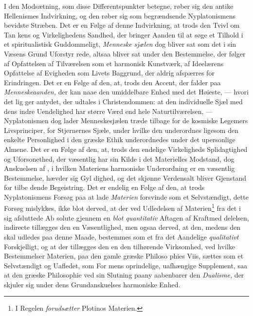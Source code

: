 I den Modsætning, som disse Differentspunkter betegne,
røber sig den antike Hellenismes Indvirkning, og den røber
sig som begrændsende Nyplatonismens bevidste Stræben. Det
er en Følge af denne Indvirkning, at trods den Tvivl om Tan\-%
kens og Virkelighedens Sandhed, der bringer Aanden til at
søge et Tilhold i et spiritualistisk Guddommeligt, \emph{Menneske\-%
sjælen} dog bliver sat som det i sin Væsens Grund Uforstyr\-%
rede, altsaa bliver sat under den Bestemmelse, der følger af
Opfattelsen af Tilværelsen som et harmonisk Kunstværk, af
Ideelærens Opfattelse af Evigheden som Livets Baggrund, der
aldrig afspærres for Erindringen. Det er en Følge af den, at,
trods den Accent, der falder paa \emph{Menneskeaanden,} der kan
naae den umiddelbare Enhed med det Høieste, --- hvori det lig\-%
ger antydet, der udtales i Christendommen: at den individuelle
Sjæl med dens indre Uendelighed har større Værd end hele
Naturtilværelsen, --- Nyplatonismen dog lader Menneskesjælen
træde tilbage for de kosmiske Legemers Livsprinciper, for
 \setcounter{footnote}{0}
Stjernernes Sjæle, under hvilke den underordnes ligesom den
enkelte Personlighed i den græske Ethik underordnedes under
det upersonlige Almene. Det er en Følge af den, at, trods
den endelige Virkeligheds Splidagtighed og Uforsonethed, der
væsentlig har sin Kilde i det Materielles Modstand, dog
Anskuelsen af , i hvilken Materiens harmoniske
Underordning er en væsentlig Bestemmelse, hævder sig Gyl\-%
dighed, og det skjønne Verdensalt bliver Gjenstand for tilbe\-%
dende Begeistring. Det er endelig en Følge af den, at trods
Nyplatonismens Forsøg paa at lade \emph{Materien} forsvinde som
et Selvstændigt, dette Forsøg mislykkes, ikke blot derved, at
der ved Udledelsen af Materien\footnote{I Regelen \emph{forudsætter} Plotinos Materien.} fra det i sig afsluttede Ab\-%
solute gjennem en \emph{blot quantitativ} Aftagen af Kraftmed\-%
delelsen, indirecte tillægges den en Væsentlighed, men ogsaa
derved, at den, medens den skal udledes paa denne Maade,
bestemmes som et fra det Aandelige \emph{qualitativt} Forskjelligt,
og at der tillægges den en den tilhørende Virksomhed, ved
hvilke Bestemmelser Materien, paa den gamle græske Philoso\-%
phies Viis, sættes som et Selvstændigt og Uafledet, som For\-%
mens oprindelige, uafhængige Supplement, saa at den græske
Philosophie ved sin Slutning paany aabenbarer den \emph{Dualisme,}
der skjuler sig under dens Grundanskuelses harmoniske Enhed.

